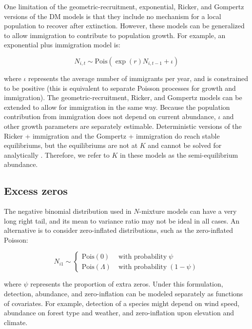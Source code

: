 \documentclass[12pt,english]{article}
\begin{document}
\begin{spacing}{1.9}
\begin{flushleft}
One limitation of the geometric-recruitment, exponential,
Ricker, and Gompertz versions of the DM models 
is that they include no mechanism for a local population to recover
after extinction. 
However, these models can be generalized 
to allow immigration to contribute
to population growth. For example, an exponential plus immigration
model is:
\begin{linenomath*}
\begin{equation}
  N_{i,t} \sim \mathrm{Pois}(\exp(r)N_{i,t-1} + \iota)
  \label{eq:expimm2}
\end{equation}
\end{linenomath*}
where $\iota$ represents the average number of immigrants per year, and is
constrained to be
positive (this is equivalent to separate Poisson processes for
growth and immigration).  
The geometric-recruitment, Ricker,
and Gompertz models can be extended to allow for immigration in the
same way.  Because the population contribution from immigration does
not depend on current abundance, $\iota$ and other growth parameters
are separately estimable.
 Deterministic versions of the Ricker + immigration and the 
Gompertz + immigration do reach stable equilibriums, but the equilibriums 
are not at $K$ and cannot be solved for analytically \citep{otto_day:2007}.  Therefore, we
refer to $K$ in these models as the semi-equilibrium abundance.

\subsection*{Excess zeros}

The negative binomial distribution used in $N$-mixture models can have
a very long right tail, and its mean to variance ratio may not be
ideal in all cases. An alternative is to consider zero-inflated
distributions, such as the zero-inflated Poisson:
\begin{linenomath*}
\begin{equation}
N_{i1} \sim \left\{
\begin{aligned}
\mbox{Pois}(0) &\; \text{with probability} \; \psi \\
\mbox{Pois}(\Lambda) &\; \text{with probability} \; (1-\psi)
\end{aligned} \right.
\label{eq:ZIP}
\end{equation}
\end{linenomath*}
where $\psi$ represents the proportion of extra zeros. 
Under this formulation, 
detection, abundance, and zero-inflation can be modeled separately as
functions of covariates. For example, detection of a
species might depend on wind speed,
abundance on forest type and weather, and zero-inflation upon elevation and
climate.  


\end{flushleft}
\end{spacing}
\end{document}
